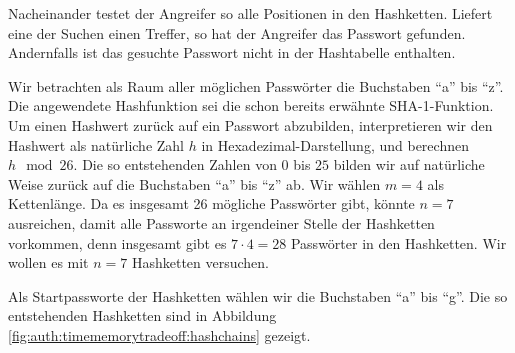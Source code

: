 Nacheinander testet der Angreifer so alle Positionen in den Hashketten. Liefert eine der Suchen einen Treffer, so hat der Angreifer das Passwort gefunden. Andernfalls ist das gesuchte Passwort nicht in der Hashtabelle enthalten.\\

\begin{beispiel}
\label{ex:auth:timememorytradeoff}
Wir betrachten als Raum aller möglichen Passwörter die Buchstaben "`a"' bis "`z"'.
Die angewendete Hashfunktion sei die schon bereits erwähnte SHA-1-Funktion.
Um einen Hashwert zurück auf ein Passwort abzubilden, interpretieren wir den Hashwert als natürliche Zahl $h$ in Hexadezimal-Darstellung, und berechnen $h \mod 26$.
Die so entstehenden Zahlen von $0$ bis $25$ bilden wir auf natürliche Weise zurück auf die Buchstaben "`a"' bis "`z"' ab.
Wir wählen $m = 4$ als Kettenlänge.
Da es insgesamt 26 mögliche Passwörter gibt, könnte $n = 7$ ausreichen, damit alle Passworte an irgendeiner Stelle der Hashketten vorkommen, denn insgesamt gibt es $7 \cdot 4 = 28$ Passwörter in den Hashketten.
Wir wollen es mit $n = 7$ Hashketten versuchen.

Als Startpassworte der Hashketten wählen wir die Buchstaben "`a"' bis "`g"'. Die so entstehenden Hashketten sind in Abbildung \ref{fig:auth:timememorytradeoff:hashchains} gezeigt.


\end{beispiel}
